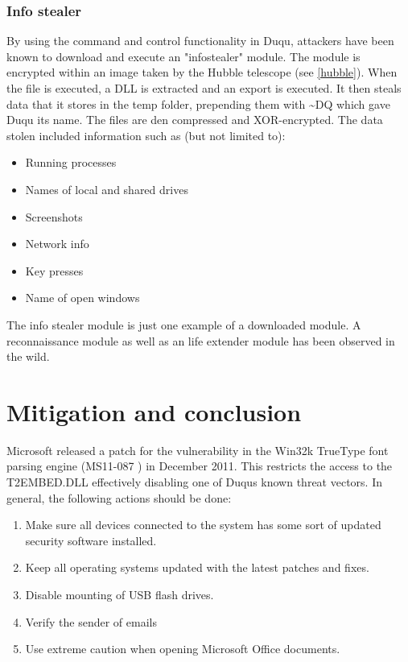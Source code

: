 \documentclass[11pt,english,a4paper]{report}
\begin{document}
\subsection{Info stealer}
By using the command and control functionality in Duqu, attackers have been known to download and execute an "infostealer" module. The module is encrypted within an image taken by the Hubble telescope (see \ref{hubble}). When the file is executed, a DLL is extracted and an export is executed. It then steals data that it stores in the temp folder, prepending them with \textasciitilde DQ which gave Duqu its name.
The files are den compressed and XOR-encrypted. The data stolen included information such as (but not limited to):
\begin{itemize}
  \item Running processes
  \item Names of local and shared drives
  \item Screenshots
  \item Network info
  \item Key presses
  \item Name of open windows
\end{itemize}
The info stealer module is just one example of a downloaded module. A reconnaissance module as well as an life extender module has been observed in the wild.

\chapter{Mitigation and conclusion}
Microsoft released a patch for the vulnerability in the Win32k TrueType font parsing engine (MS11-087 \cite{TT_MSB}) in  December 2011. This restricts the access to the T2EMBED.DLL effectively disabling one of Duqus known threat vectors. In general, the following actions should be done:
 \begin{enumerate}
   \item Make sure all devices connected to the system has some sort of updated security software installed.
   \item Keep all operating systems updated with the latest patches and fixes.
   \item Disable mounting of USB flash drives. 
   \item Verify the sender of emails
   \item Use extreme caution when opening Microsoft Office documents. 
  \end{enumerate}
\end{document}

